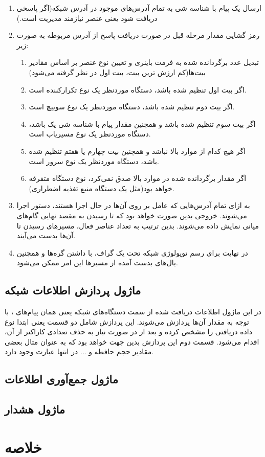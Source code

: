 \begin{enumerate}
    \item ارسال یک پیام  با شناسه شی  به تمام آدرس‌های موجود در آدرس شبکه(اگر پاسخی دریافت شود یعنی عنصر نیازمند مدیریت است.)
    \item رمز گشایی مقدار مرحله قبل در صورت دریافت پاسخ از آدرس مربوطه به صورت زیر:
    \begin{enumerate}
        \item تبدیل عدد برگردانده شده به فرمت باینری و تعیین نوع عنصر بر اساس مقادیر بیت‌ها(کم ارزش ترین بیت، بیت اول در نظر گرفته می‌شود)
        \item اگر بیت اول تنظیم شده باشد، دستگاه موردنظر یک نوع تکرارکننده است.
        \item اگر بیت دوم تنظیم شده باشد، دستگاه موردنظر یک نوع سوییچ است.
        \item اگر بیت سوم تنظیم شده باشد و همچنین مقدار پیام  با شناسه شی  یک باشد، دستگاه موردنظر یک نوع مسیریاب است.
        \item اگر هیچ کدام از موارد بالا نباشد و همچنین بیت چهارم یا هفتم تنظیم شده باشد، دستگاه موردنظر یک نوع سرور است.
        \item اگر مقدار برگردانده شده در موارد بالا صدق نمی‌کرد، نوع دستگاه متفرقه خواهد بود(مثل یک دستگاه منبع تغذیه اضطراری). 
    \end{enumerate}
    \item به ازای تمام آدرس‌هایی که عامل  بر روی آن‌ها در حال اجرا هستند، دستور  اجرا می‌شوند. خروجی بدین صورت خواهد بود که تا رسیدن به مقصد نهایی گام‌های میانی نمایش داده می‌شوند. بدین ترتیب به تعداد عناصر فعال، مسیرهای رسیدن تا آن‌ها بدست می‌آیند.
    \item در نهایت برای رسم توپولوژی شبکه تحت یک گراف، با داشتن گره‌ها و همچنین یال‌های بدست آمده از مسیرها این امر ممکن می‌شود.
\end{enumerate}




\subsection{ماژول پردازش اطلاعات شبکه}

در این ماژول اطلاعات دریافت شده از سمت دستگاه‌های شبکه یعنی همان پیام‌های ، با توجه به مقدار آن‌ها پردازش می‌شوند. این پردازش شامل دو قسمت یعنی ابتدا نوع داده دریافتی را مشخص کرده و بعد از در صورت نیاز به حذف تعدادی کاراکتر از آن، اقدام می‌شود. قسمت دوم این پردازش بدین جهت خواهد بود که به عنوان مثال بعضی مقادیر حجم حافظه و ... در انتها عبارت  وجود دارد.

\subsection{ماژول جمع‌آوری اطلاعات }

\subsection{ماژول هشدار}





\section{خلاصه}
